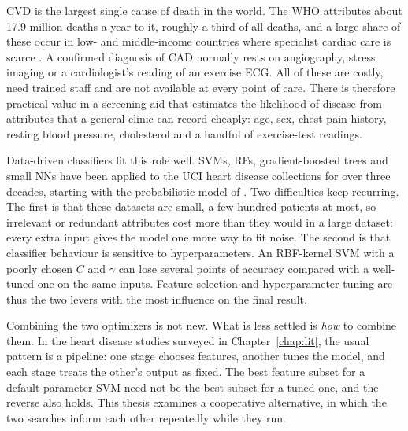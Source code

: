 \documentclass[MTech]{ugthesis}
\begin{document}
\ac{CVD} is the largest single cause of death in the world. The \ac{WHO} attributes about 17.9 million deaths a year to it, roughly a third of all deaths, and a large share of these occur in low- and middle-income countries where specialist cardiac care is scarce \citep{who2021cvd}. A confirmed diagnosis of \ac{CAD} normally rests on angiography, stress imaging or a cardiologist's reading of an exercise \ac{ECG}. All of these are costly, need trained staff and are not available at every point of care. There is therefore practical value in a screening aid that estimates the likelihood of disease from attributes that a general clinic can record cheaply: age, sex, chest-pain history, resting blood pressure, cholesterol and a handful of exercise-test readings.

Data-driven classifiers fit this role well. \ac{SVM}s, \ac{RF}s, gradient-boosted trees and small \ac{NN}s have been applied to the \ac{UCI} heart disease collections for over three decades, starting with the probabilistic model of \citet{detrano1989}. Two difficulties keep recurring. The first is that these datasets are small, a few hundred patients at most, so irrelevant or redundant attributes cost more than they would in a large dataset: every extra input gives the model one more way to fit noise. The second is that classifier behaviour is sensitive to hyperparameters. An RBF-kernel SVM with a poorly chosen $C$ and $\gamma$ can lose several points of accuracy compared with a well-tuned one on the same inputs. Feature selection and hyperparameter tuning are thus the two levers with the most influence on the final result.

Combining the two optimizers is not new. What is less settled is \emph{how} to combine them. In the heart disease studies surveyed in Chapter~\ref{chap:lit}, the usual pattern is a pipeline: one stage chooses features, another tunes the model, and each stage treats the other's output as fixed. The best feature subset for a default-parameter SVM need not be the best subset for a tuned one, and the reverse also holds. This thesis examines a cooperative alternative, in which the two searches inform each other repeatedly while they run.
\end{document}
